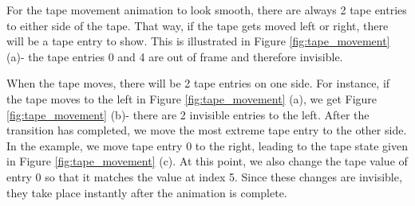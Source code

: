For the tape movement animation to look smooth, there are always 2 tape entries to either side of the tape. That way, if the tape gets moved left or right, there will be a tape entry to show. This is illustrated in Figure \ref{fig:tape_movement} (a)- the tape entries 0 and 4 are out of frame and therefore invisible. 

When the tape moves, there will be 2 tape entries on one side. For instance, if the tape moves to the left in Figure \ref{fig:tape_movement} (a), we get Figure \ref{fig:tape_movement} (b)- there are 2 invisible entries to the left. After the transition has completed, we move the most extreme tape entry to the other side. In the example, we move tape entry 0 to the right, leading to the tape state given in Figure \ref{fig:tape_movement} (c). At this point, we also change the tape value of entry 0 so that it matches the value at index 5. Since these changes are invisible, they take place instantly after the animation is complete.
